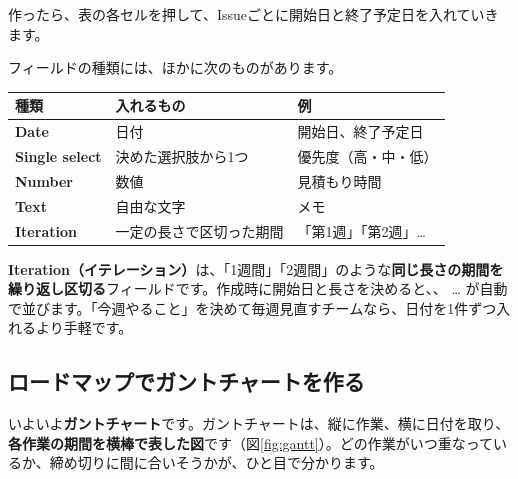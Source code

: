 作ったら、表の各セルを押して、Issueごとに開始日と終了予定日を入れていきます。


\noindent フィールドの種類には、ほかに次のものがあります。

\begin{center}
\begin{tabularx}{\linewidth}{@{}>{\raggedright\arraybackslash}p{3.2cm} X >{\raggedright\arraybackslash}p{4.2cm}@{}}
\toprule
種類 & 入れるもの & 例 \\
\midrule
\textbf{Date} & 日付 & 開始日、終了予定日 \\
\textbf{Single select} & 決めた選択肢から1つ & 優先度（高・中・低） \\
\textbf{Number} & 数値 & 見積もり時間 \\
\textbf{Text} & 自由な文字 & メモ \\
\textbf{Iteration} & 一定の長さで区切った期間 & 「第1週」「第2週」… \\
\bottomrule
\end{tabularx}
\end{center}

\medskip

\textbf{Iteration（イテレーション）}は、「1週間」「2週間」のような\textbf{同じ長さの期間を繰り返し区切る}フィールドです。作成時に開始日と長さを決めると、、 … が自動で並びます。「今週やること」を決めて毎週見直すチームなら、日付を1件ずつ入れるより手軽です。

\subsection{ロードマップでガントチャートを作る}

いよいよ\textbf{ガントチャート}です。ガントチャートは、縦に作業、横に日付を取り、\textbf{各作業の期間を横棒で表した図}です（図\ref{fig:gantt}）。どの作業がいつ重なっているか、締め切りに間に合いそうかが、ひと目で分かります。

